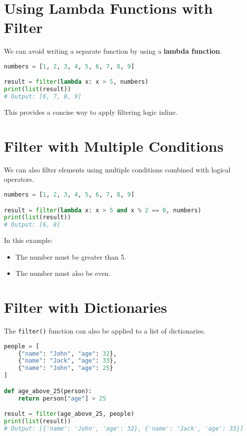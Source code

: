 \section{Using Lambda Functions with Filter}
We can avoid writing a separate function by using a \textbf{lambda function}.

\begin{lstlisting}[language=Python, caption={Filtering numbers greater than 5 using lambda}]
numbers = [1, 2, 3, 4, 5, 6, 7, 8, 9]

result = filter(lambda x: x > 5, numbers)
print(list(result))
# Output: [6, 7, 8, 9]
\end{lstlisting}

This provides a concise way to apply filtering logic inline.

\section{Filter with Multiple Conditions}
We can also filter elements using multiple conditions combined with logical operators.

\begin{lstlisting}[language=Python, caption={Filtering even numbers greater than 5}]
numbers = [1, 2, 3, 4, 5, 6, 7, 8, 9]

result = filter(lambda x: x > 5 and x % 2 == 0, numbers)
print(list(result))
# Output: [6, 8]
\end{lstlisting}

In this example:
\begin{itemize}
    \item The number must be greater than 5.
    \item The number must also be even.
\end{itemize}

\section{Filter with Dictionaries}
The \texttt{filter()} function can also be applied to a list of dictionaries.

\begin{lstlisting}[language=Python, caption={Filtering people with age > 25}]
people = [
    {"name": "John", "age": 32},
    {"name": "Jack", "age": 33},
    {"name": "John", "age": 25}
]

def age_above_25(person):
    return person["age"] > 25

result = filter(age_above_25, people)
print(list(result))
# Output: [{'name': 'John', 'age': 32}, {'name': 'Jack', 'age': 33}]
\end{lstlisting}

